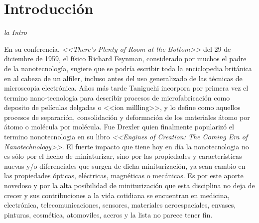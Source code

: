  \newcommand{\NoBiblioIntro}[1]{
 \ifthenelse{\equal{#1}{verdadero}}{}{}
 \NoBiblioIntro{verdadero}}


 \FormatoCapituloUnaLinea

 \chapter{Introducción}\label{chap:Introduccion}

 \thispagestyle{empty}
	
 \noindent\textit{la Intro}

 
 \vfill
 \minitoc
 \newpage


En su conferencia, \textit{<<There's Plenty of Room at the Bottom>>} del 29 de diciembre de 1959, el físico Richard Feynman, considerado por muchos el padre de la nanotecnología, sugiere que se podría escribir toda la enciclopedia británica en al cabeza de un alfiler, incluso antes del uso generalizado de las técnicas de microscopia electrónica.\cite{Feynman1959}  Años más tarde Taniguchi incorpora por primera vez el termino nano-tecnologia para describir procesos de microfabricación como deposito de películas delgadas o <<ion millling>>, y lo define como aquellos procesos de separación, consolidación y deformación de los materiales átomo por átomo o molécula por molécula. \cite{taniguchi1974} Fue Drexler quien finalmente popularizó el termino nonotecnologia en su libro \textit{<<Engines of Creation: The Coming Era of Nanotechnology>>}\cite{drexler1986}. El fuerte impacto que tiene hoy en día la nonotecnologia no es sólo por el hecho de miniaturizar, sino por las propiedades y características nuevas y/o diferenciales que surgen de dicha miniturización, ya sean cambio en las propiedades ópticas, eléctricas, magnéticas o mecánicas. Es por este aporte novedoso y por la alta posibilidad de miniturización que esta disciplina no deja de crecer y sus contribuciones a la vida cotidiana se encuentran en medicina, electrónica, telecomunicaciones, sensores, materiales aeroespaciales, envases, pinturas, cosmética, atomoviles, aceros y la lista no parece tener fin.

